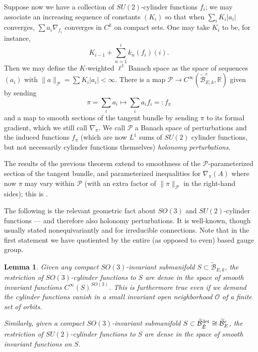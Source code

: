 \documentclass[10pt,a4paper]{amsart}
\newtheorem{lemma}[theorem]{Lemma}
\theoremstyle{definition}
\theoremstyle{remark}
\numberwithin{figure}{qchap}
\begin{document}
Suppose now we have a collection of $SU(2)$-cylinder functions $f_i$; we may associate an increasing sequence of constants $(K_i)$ so that when $\sum_i K_i |a_i|$ converges, $\sum a_i \nabla_{f_i}$ converges in $C^k$ on compact sets. One may take $K_i$ to be, for instance, 
$$K_{i-1} + \sum_{n=1}^i k_n(f_i)(i).$$ Then we may define the $K$-weighted $\ell^1$ Banach space as the space of sequences $(a_i)$ with $\|a\|_{\mathcal P} = \sum K_i |a_i| < \infty$. There is a map $\mathcal P \to C^\infty(\widetilde{\mathcal B}^e_{E,k}, \mathbb R)$ given by sending 
$$\pi = \sum_i a_i \mapsto \sum_i a_i f_i =: f_\pi$$ 
and a map to smooth sections of the tangent bundle by sending $\pi$ to its formal gradient, which we still call $\nabla_\pi$. We call $\mathcal P$ a Banach space of perturbations and the induced functions $f_\pi$ (which are now $L^1$ sums of $SU(2)$ cylinder functions, but not necessarily cylinder functions themselves) \textit{holonomy perturbations}. 

The results of the previous theorem extend to smoothness of the $\mathcal P$-parameterized section of the tangent bundle, and parameterized inequalities for $\nabla_\pi(A)$ where now $\pi$ may vary within $\mathcal P$ (with an extra factor of $\|\pi\|_{\mathcal P}$ in the right-hand sides); this is \cite[Proposition~3.7]{KM1}. 

The following is the relevant geometric fact about $SO(3)$ and $SU(2)$-cylinder functions --- and therefore also holonomy perturbations. It is well-known, though usually stated nonequivariantly and for irreducible connections. Note that in the first statement we have quotiented by the entire (as opposed to even) based gauge group.

\begin{lemma}\label{dense}Given any compact $SO(3)$-invariant submanifold $S \subset \widetilde{\mathcal B}_{E,k}$, the restriction of $SO(3)$-cylinder functions to $S$ are dense in the space of smooth invariant functions $C^\infty(S)^{SO(3)}$. This is furthermore true even if we demand the cylinder functions vanish in a small invariant open neighborhood $\mathcal O$ of a finite set of orbits.

Similarly, given a compact $SO(3)$-invariant submanifold $S \subset \widetilde{\mathcal B}^{\textup{det}}_{\tilde E} \cong \widetilde{\mathcal B}^e_E$, the restriction of $SU(2)$-cylinder functions to $S$ are dense in the space of smooth invariant functions on $S$.
\end{lemma}
\end{document}

